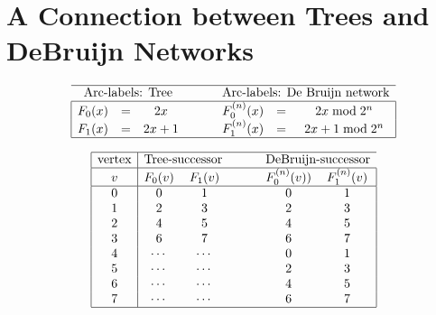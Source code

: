 \section{A Connection between Trees and DeBruijn Networks} 
\label{Appendix:tree-DB}

\[
\begin{array}{|ccccccc|}
\hline
\multicolumn{3}{c}{\mbox{Arc-labels: Tree}} & \hspace*{.2in}& \multicolumn{3}{c}{\mbox{Arc-labels: De Bruijn network}} \\
\hline 
F_0(x) & = & 2x      &  &  F^{(n)}_0(x) & = & 2x \bmod 2^n \\
F_1(x) & = & 2x+1  &  &  F^{(n)}_1(x) & = & 2x +1 \bmod 2^n \\ 
\hline
\end{array}
\]

\[
\begin{array}{|c|ccccc|}
\hline
\mbox{vertex} & \multicolumn{2}{c}{\mbox{Tree-successor}} & \hspace*{.2in} & \multicolumn{2}{c}{\mbox{DeBruijn-successor}} \\
\hline
v & F_0(v) & F_1(v) & & F^{(n)}_0(v))& F^{(n)}_1(v) \\
\hline
0 & 0 & 1 & & 0 & 1 \\ 
1 & 2 & 3 & & 2 & 3 \\
2 & 4 & 5 & & 4 & 5 \\
3 & 6 & 7 & & 6 & 7 \\
4 & \cdots & \cdots  & & 0 & 1 \\
5 & \cdots & \cdots  & & 2 & 3 \\
6 & \cdots & \cdots  & & 4 & 5 \\
7 & \cdots & \cdots  & & 6 & 7 \\
\hline
\end{array}
\]
